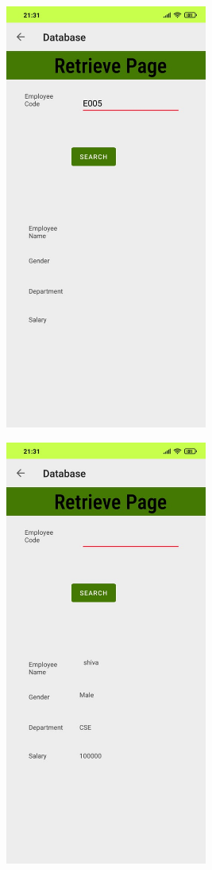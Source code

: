 \documentclass[12pt,letterpaper]{article}
\begin{document}
\newpage
\subsubsection*{}
\begin{figure}[h]
    \centering
    \includegraphics[height=14cm, keepaspectratio]{Outputs/OP11.png}
\end{figure}
\begin{figure}
    \centering
    \includegraphics[height=14cm, keepaspectratio]{Outputs/OP12.png}
\end{figure}
\end{document}
